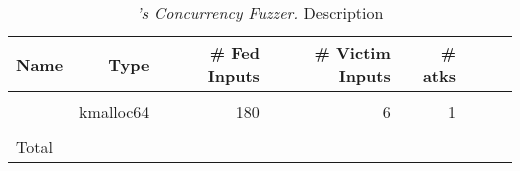 \begin{table}[ht!]
	\footnotesize
	\centering
	\begin{tabular}{l|r|r|r|r|r|r|r}
		{\bf Name} & {\bf Type} & {\bf \# Fed Inputs}& {\bf \# Victim Inputs} & {\bf \# atks}  \\
		\hline
		\apache    &             &     &    &   \\
		\linux     &  kmalloc64  & 180   &  6  &  1   \\
		\hline\\[-2.3ex]
		Total      &             &    &   & \\
	\end{tabular}
	\vspace{-.1in}
	\caption{{\em \xxx's Concurrency Fuzzer.} \rm {Description}} 
	\label{tab:eval}
	\vspace{-.2in}
\end{table}


